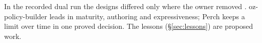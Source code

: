 In the recorded dual run the designs differed only where the owner removed
. oz-policy-builder leads in maturity, authoring and
expressiveness; Perch keeps a limit over time in one proved decision. The lessons
(\S\ref{sec:lessons}) are proposed work.
